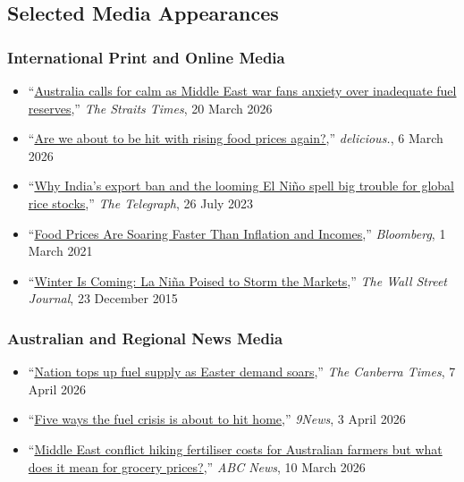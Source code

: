\documentclass[10pt]{article}
\begin{document}
	\subsection*{Selected Media Appearances} 
	
	\subsubsection*{International Print and Online Media} 
	\begin{itemize} 
		\item  ``\href{https://www.straitstimes.com/asia/australianz/australia-calls-for-calm-as-middle-east-war-fans-anxiety-over-inadequate-fuel-reserves}{Australia calls for calm as Middle East war fans anxiety over inadequate fuel reserves},'' \textit{The Straits Times}, 20 March 2026
		\item ``\href{https://www.delicious.com.au/food-files/news-articles/article/could-middle-east-conflict-cause-rising-food-prices-australia/ksppsh8c}{Are we about to be hit with rising food prices again?},'' \textit{delicious.}, 6 March 2026
		\item ``\href{https://www.telegraph.co.uk/global-health/climate-and-people/india-rice-export-global-ban-food-security-shortsages/}{Why India’s export ban and the looming El Niño spell big trouble for global rice stocks},'' \textit{The Telegraph}, 26 July 2023 
		\item ``\href{https://www.bloomberg.com/news/articles/2021-03-01/inflation-2021-malnutrition-and-hunger-fears-rise-as-food-prices-soar-globally}{Food Prices Are Soaring Faster Than Inflation and Incomes},'' \textit{Bloomberg}, 1 March 2021 
		\item ``\href{https://www.wsj.com/articles/winter-is-coming-la-nina-poised-to-storm-the-markets-1450850704}{Winter Is Coming: La Niña Poised to Storm the Markets},'' \textit{The Wall Street Journal}, 23 December 2015 
	\end{itemize} 
		
	\subsubsection*{Australian and Regional News Media} 
	\begin{itemize} 
		\item ``\href{https://www.canberratimes.com.au/story/9215181/nation-tops-up-fuel-supply-as-easter-demand-soars/}{Nation tops up fuel supply as Easter demand soars},'' \textit{The Canberra Times}, 7 April 2026 
		\item ``\href{https://www.9news.com.au/national/five-ways-the-fuel-crisis-is-about-to-hit-home/f052e047-39b5-4494-ba9c-fea253b7eeba}{Five ways the fuel crisis is about to hit home},'' \textit{9News}, 3 April 2026 
		\item ``\href{https://www.abc.net.au/news/2026-03-10/urea-fertiliser-shortage-hits-australian-farmers-iran-conflict/106433284}{Middle East conflict hiking fertiliser costs for Australian farmers but what does it mean for grocery prices?},'' \textit{ABC News}, 10 March 2026 
	\end{itemize} 
	
\end{document}
